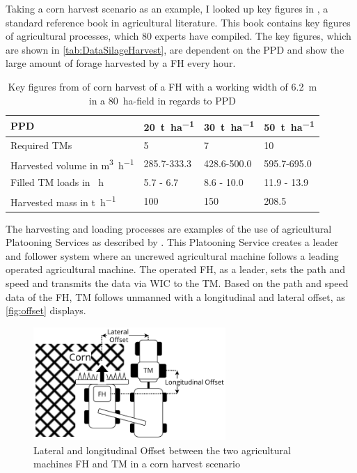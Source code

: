 Taking a corn harvest scenario as an example, I looked up key figures in \cite{faustzahlen2018}, a standard reference book in agricultural literature. This book contains key figures of agricultural processes, which 80 experts have compiled. The key figures, which are shown in \autoref{tab:DataSilageHarvest}, are dependent on the \ac{PPD} and show the large amount of forage harvested by a \ac{FH} every hour.
\begin{table}[H]
	\centering
	\begin{tabular}{>{\raggedright}p{4.9cm}p{1.8cm}p{1.8cm}p{1.8cm}}
		\toprule
  		\acf{PPD}&\SI{20}{\tonne\per\hectare}&\SI{30}{\tonne\per\hectare} & \SI{50}{\tonne\per\hectare}\\
		\midrule
		Required \acl{TM}s & \num{5}&
		\num{7} & \num{10} \\
		Harvested volume in \si{\cubic\metre\per\hour} &
		\num{285.7}-\num{333.3}
		& \num{428.6}-\num{500.0} &
		\num{595.7}-\num{695.0}\\
		Filled \acl{TM} loads in \si{\per\hour} &
		\num{5.7} - \num{6.7}
		& \num{8.6} - \num{10.0} &
		\num{11.9} - \num{13.9}\\
		Harvested mass in \si{\tonne\per\hour} & \num{100}
		& \num{150} &
		\num{208.5} \\
		\bottomrule
	\end{tabular}
	\caption{Key figures from \cite{faustzahlen2018} of corn harvest of a \acf{FH} with a working width of \SI{6.2}{\metre} in a \SI{80}{\hectare}-field in regards to \acf{PPD}}
	\label{tab:DataSilageHarvest}
\end{table}

The harvesting and loading processes are examples of the use of agricultural Platooning Services as described by 
\textcite{zhang_method_2009}.
This Platooning Service creates a leader and follower system where an uncrewed agricultural machine follows a leading operated agricultural machine.
The operated \ac{FH}, as a leader, sets the path and speed and transmits the data via \ac{WIC} to the \ac{TM}. Based on the path and speed data of the \ac{FH}, \ac{TM} follows unmanned with a longitudinal and lateral offset, as \autoref{fig:offset} displays.
\begin{figure}[H]
	\centering
	\includegraphics[width=0.65\textwidth]{figures/offset_platoon.pdf}
	\caption{Lateral and longitudinal Offset between the two agricultural machines \acf{FH} and \acf{TM} in a corn harvest scenario}%
	\label{fig:offset}%
\end{figure}

